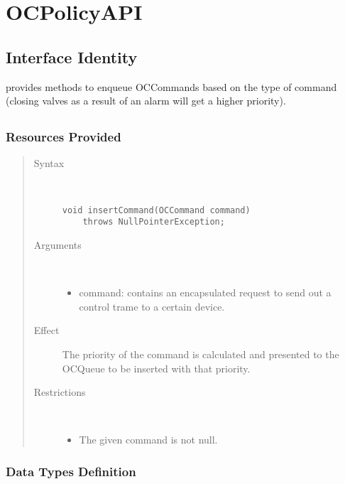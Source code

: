 \section{OCPolicyAPI}
\label{api:oc-policy-api}

\subsection{Interface Identity}

\npar {} provides methods to enqueue
OCCommands based on the type of command (closing valves as a result
of an alarm will get a higher priority).

\subsection{}

\subsubsection{Resources Provided}

\begin{quote}
	\begin{description}
		\item[Syntax] \ 
		\begin{verbatim}
void insertCommand(OCCommand command) 
    throws NullPointerException;
		\end{verbatim}
		\item[Arguments] \
		\begin{itemize}
			\item command: contains an encapsulated request to send out a control trame
			to a certain device.
		\end{itemize}
		\item[Effect] The priority of the command is calculated and presented to the
		OCQueue to be inserted with that priority.
		\item[Restrictions] \ 
		\begin{itemize}
			\item The given command is not null.
		\end{itemize}
	\end{description} 
\end{quote}

\subsubsection{Data Types Definition}

